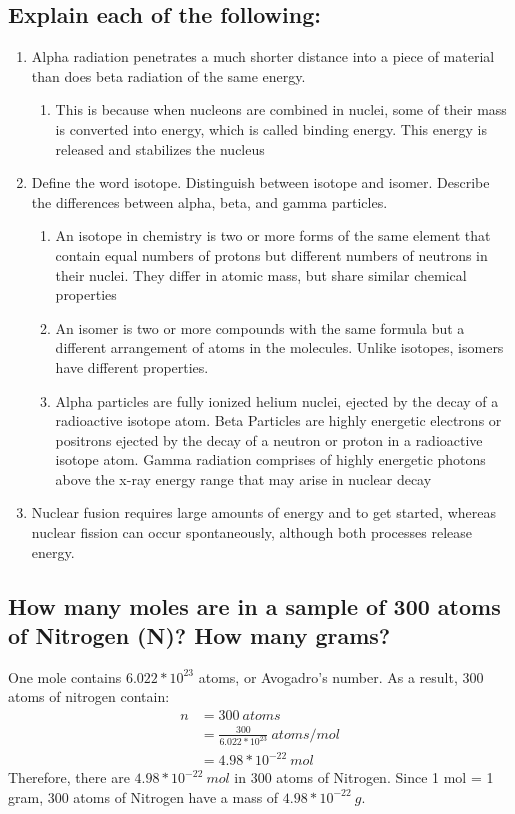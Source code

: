 \documentclass[11pt]{article}
\begin{document}
\subsection{Explain each of the following:}
\label{sec:orgb47402f}
\begin{enumerate}
\item Alpha radiation penetrates a much shorter distance into a piece of material than does beta radiation of the same energy.
\begin{enumerate}
\item This is because when nucleons are combined in nuclei, some of their mass is converted into energy, which is called binding energy. This energy is released and stabilizes the nucleus
\end{enumerate}
\item Define the word isotope. Distinguish between isotope and isomer. Describe the differences between alpha, beta, and gamma particles.
\begin{enumerate}
\item An isotope in chemistry is two or more forms of the same element that contain equal numbers of protons but different numbers of neutrons in their nuclei. They differ in atomic mass, but share similar chemical properties
\item An isomer is two or more compounds with the same formula but a different arrangement of atoms in the molecules. Unlike isotopes, isomers have different properties.
\item Alpha particles are fully ionized helium nuclei, ejected by the decay of a radioactive isotope atom. Beta Particles are highly energetic electrons or positrons ejected by the decay of a neutron or proton in a radioactive isotope atom. Gamma radiation comprises of highly energetic photons above the x-ray energy range that may arise in nuclear decay
\end{enumerate}
\item Nuclear fusion requires large amounts of energy and to get started, whereas nuclear fission can occur spontaneously, although both processes release energy.
\end{enumerate}

\subsection{How many moles are in a sample of 300 atoms of Nitrogen (N)? How many grams?}
\label{sec:org1d021dd}
One mole contains \(6.022 *10^{23}\) atoms, or Avogadro's number. As a result, 300 atoms of nitrogen contain:
\begin{align*}
n&=300\ atoms\\
&=\frac{300}{6.022*10^{23}}\ atoms/mol\\
&=4.98*10^{-22}\ mol
\end{align*}
Therefore, there are \(4.98*10^{-22}\ mol\) in 300 atoms of Nitrogen. Since 1 mol = 1 gram, 300 atoms of Nitrogen have a mass of \(4.98*10^{-22}\ g\).
\end{document}
